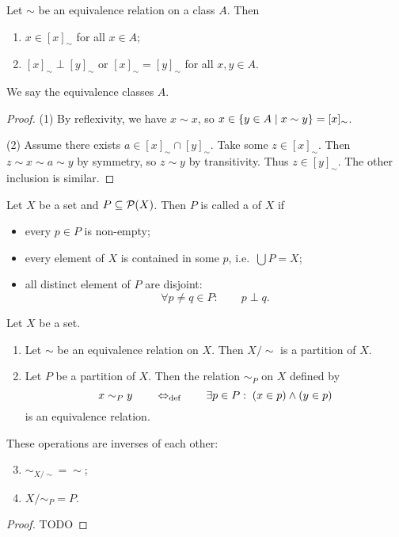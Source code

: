 \begin{proposition}
Let $\sim$ be an equivalence relation on a class $A$. Then
\begin{enumerate}
\item $x\in [x]_\sim$ for all $x\in A$;
\item $[x]_\sim \perp [y]_\sim$ or $[x]_\sim = [y]_\sim$ for all $x,y\in A$.
\end{enumerate}
\end{proposition}
We say the equivalence classes  $A$.
\begin{proof}
(1) By reflexivity, we have $x\sim x$, so $x\in \left\{ y\in A \;\middle|\; x\sim y \right\} = [x]_\sim$.

(2) Assume there exists $a\in [x]_\sim \cap [y]_\sim$. Take some $z\in [x]_\sim$. Then $z\sim x \sim a \sim y$ by symmetry, so $z\sim y$ by transitivity. Thus $z\in [y]_\sim$. The other inclusion is similar.  
\end{proof}

\begin{definition}
Let $X$ be a set and $P\subseteq \operatorname{\mathcal{P}}(X)$. Then $P$ is called a  of $X$ if
\begin{itemize}
\item every $p\in P$ is non-empty;
\item every element of $X$ is contained in some $p$, i.e.\ $\bigcup P = X$;
\item all distinct element of $P$ are disjoint:
\[ \forall p\neq q\in P: \qquad p\perp q. \]
\end{itemize}
\end{definition}

\begin{proposition}
Let $X$ be a set.
\begin{enumerate}
\item Let $\sim$ be an equivalence relation on $X$. Then $X/{\sim}$ is a partition of $X$.
\item Let $P$ be a partition of $X$. Then the relation $\sim_P$ on $X$ defined by
\[ x \sim_P y \quad\quad\Leftrightarrow_{\text{def}}\quad\quad \exists p\in P: \; (x\in p)\land (y\in p) \]
is an equivalence relation.
\end{enumerate}
These operations are inverses of each other:
\begin{enumerate} \setcounter{enumi}{2}
\item ${\sim_{X/{\sim}}} = {\sim}$;
\item $X/{\sim_{P}} = P$.
\end{enumerate}
\end{proposition}
\begin{proof}
TODO
\end{proof}


